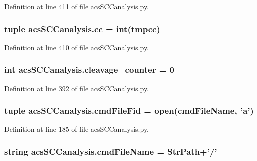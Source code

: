 Definition at line 411 of file acs\-S\-C\-Canalysis.\-py.

\hypertarget{a00096_a67fcb77a15f51e94c98bb48b05865715}{
\subsubsection[{cc}]{\setlength{\rightskip}{0pt plus 5cm}tuple acs\-S\-C\-Canalysis.\-cc = int(tmpcc)}}\label{a00096_a67fcb77a15f51e94c98bb48b05865715}


Definition at line 410 of file acs\-S\-C\-Canalysis.\-py.

\hypertarget{a00096_a0dd6730b063ac11ae4620c4a0778f6d9}{
\subsubsection[{cleavage\-\_\-counter}]{\setlength{\rightskip}{0pt plus 5cm}int acs\-S\-C\-Canalysis.\-cleavage\-\_\-counter = 0}}\label{a00096_a0dd6730b063ac11ae4620c4a0778f6d9}


Definition at line 392 of file acs\-S\-C\-Canalysis.\-py.

\hypertarget{a00096_a0a501feb02e67bd6a8ba75490709cf89}{
\subsubsection[{cmd\-File\-Fid}]{\setlength{\rightskip}{0pt plus 5cm}tuple acs\-S\-C\-Canalysis.\-cmd\-File\-Fid = open({\bf cmd\-File\-Name}, '{\bf a}')}}\label{a00096_a0a501feb02e67bd6a8ba75490709cf89}


Definition at line 185 of file acs\-S\-C\-Canalysis.\-py.

\hypertarget{a00096_a32551f85ad3cd8080b8ad81828276368}{
\subsubsection[{cmd\-File\-Name}]{\setlength{\rightskip}{0pt plus 5cm}string acs\-S\-C\-Canalysis.\-cmd\-File\-Name = {\bf Str\-Path}+'/'}}\label{a00096_a32551f85ad3cd8080b8ad81828276368}


